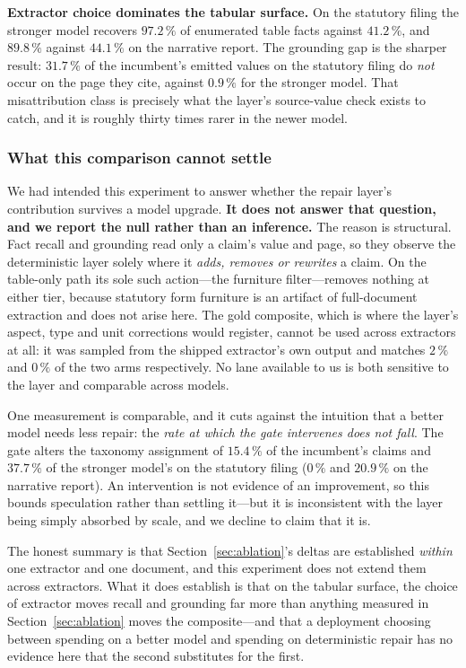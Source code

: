 \documentclass[3p,times]{elsarticle}
\begin{document}
\textbf{Extractor choice dominates the tabular surface.} On the statutory filing the
stronger model recovers $97.2\,\%$ of enumerated table facts against $41.2\,\%$, and
$89.8\,\%$ against $44.1\,\%$ on the narrative report. The grounding gap is the sharper
result: $31.7\,\%$ of the incumbent's emitted values on the statutory filing do
\emph{not} occur on the page they cite, against $0.9\,\%$ for the stronger model. That
misattribution class is precisely what the layer's source-value check exists to catch,
and it is roughly thirty times rarer in the newer model.

\subsubsection*{What this comparison cannot settle}

We had intended this experiment to answer whether the repair layer's contribution
survives a model upgrade. \textbf{It does not answer that question, and we report the
null rather than an inference.} The reason is structural. Fact recall and grounding read
only a claim's value and page, so they observe the deterministic layer solely where it
\emph{adds, removes or rewrites} a claim. On the table-only path its sole such action---the
furniture filter---removes nothing at either tier, because statutory form furniture is an
artifact of full-document extraction and does not arise here. The gold composite, which is
where the layer's aspect, type and unit corrections would register, cannot be used across
extractors at all: it was sampled from the shipped extractor's own output and matches
$2\,\%$ and $0\,\%$ of the two arms respectively. No lane available to us is both
sensitive to the layer and comparable across models.

One measurement is comparable, and it cuts against the intuition that a better model
needs less repair: the \emph{rate at which the gate intervenes does not fall}. The gate
alters the taxonomy assignment of $15.4\,\%$ of the incumbent's claims and $37.7\,\%$ of
the stronger model's on the statutory filing ($0\,\%$ and $20.9\,\%$ on the narrative
report). An intervention is not evidence of an improvement, so this bounds speculation
rather than settling it---but it is inconsistent with the layer being simply absorbed by
scale, and we decline to claim that it is.

The honest summary is that Section~\ref{sec:ablation}'s deltas are established
\emph{within} one extractor and one document, and this experiment does not extend them
across extractors. What it does establish is that on the tabular surface, the choice of
extractor moves recall and grounding far more than anything measured in
Section~\ref{sec:ablation} moves the composite---and that a deployment choosing between
spending on a better model and spending on deterministic repair has no evidence here that
the second substitutes for the first.
\end{document}
